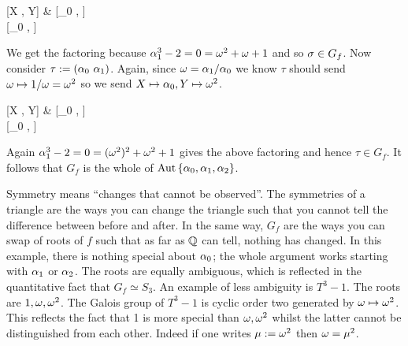 \documentclass{article}
\begin{document}
\begin{cd}
  {[X , Y]} & {[\alpha_0 , \omega]} \\
	{[\alpha_0 , \omega]}
	\arrow["\begin{array}{c} \begin{matrix}X \mapsto \alpha_1 \\ Y \mapsto \omega\end{matrix} \end{array}", from=1-1, to=1-2]
	\arrow["\begin{array}{c} \begin{matrix}X \mapsto \alpha_0 \\ Y \mapsto \omega\end{matrix} \end{array}"', from=1-1, to=2-1]
	\arrow["\simeq"', dashed, from=2-1, to=1-2]
\end{cd}
We get the factoring because $\alpha_1^3 - 2 = 0 = \omega^2 + \omega + 1$
and so $\sigma \in G_f$.
Now consider $\tau := (\alpha_0 \,\, \alpha_1)$.
Again, since $\omega = \alpha_1 / \alpha_0$ we know 
$\tau$ should send $\omega \mapsto 1 / \omega = \omega^2$ so we send 
$X \mapsto \alpha_0 , Y \mapsto \omega^2$.
\begin{cd}
  {[X , Y]} & {[\alpha_0 , \omega]} \\
	{[\alpha_0 , \omega]}
	\arrow["\begin{array}{c} \begin{matrix}X \mapsto \alpha_1 \\ Y \mapsto \omega^2\end{matrix} \end{array}", from=1-1, to=1-2]
	\arrow["\begin{array}{c} \begin{matrix}X \mapsto \alpha_0 \\ Y \mapsto \omega\end{matrix} \end{array}"', from=1-1, to=2-1]
	\arrow["\simeq"', dashed, from=2-1, to=1-2]
\end{cd}
Again $\alpha_1^3 - 2 = 0 = (\omega^2)^2 + \omega^2 + 1$ gives the above factoring
and hence $\tau \in G_f$.
It follows that $G_f$ is the whole of $\operatorname{Aut}\left\{\alpha_0 , \alpha_1 , \alpha_2\right\}$.

Symmetry means ``changes that cannot be observed''.
The symmetries of a triangle are the ways you can change the triangle
such that you cannot tell the difference between before and after.
In the same way, $G_f$ are the ways you can swap of roots of $f$
such that as far as $\mathbb{Q}$ can tell, nothing has changed.
In this example, there is nothing special about $\alpha_0$;
the whole argument works starting with $\alpha_1$ or $\alpha_2$.
The roots are equally ambiguous, which is reflected
in the quantitative fact that $G_f \simeq S_3$.
An example of less ambiguity is $T^3 - 1$.
The roots are $1, \omega , \omega^2$.
The Galois group of $T^3 - 1$ is cyclic order two generated by 
$\omega \mapsto \omega^2$.
This reflects the fact that 1 is more special than $\omega, \omega^2$
whilst the latter cannot be distinguished from each other.
Indeed if one writes $\mu := \omega^2$ then $\omega = \mu^2$.
\end{document}
